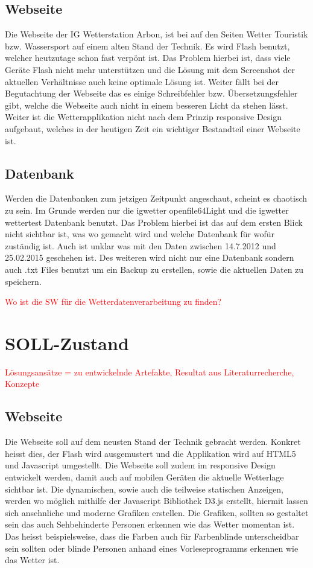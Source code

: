 \documentclass[a4paper,ngerman, 12pt]{report}
\newcommand\Diskussionspunkt[1]{\textcolor{red}{#1}}
\begin{document}
\subsection{Webseite}
Die Webseite der IG Wetterstation Arbon, ist bei auf den Seiten Wetter Touristik bzw. Wassersport auf einem alten Stand der Technik. Es wird Flash benutzt, welcher heutzutage schon fast verpönt ist. Das Problem hierbei ist, dass viele Geräte Flash nicht mehr unterstützen und die Lösung mit dem Screenshot der aktuellen Verhältnisse auch keine optimale Lösung ist. Weiter fällt bei der Begutachtung der Webseite das es einige Schreibfehler bzw. Übersetzungsfehler gibt, welche die Webseite auch nicht in einem besseren Licht da stehen lässt. Weiter ist die Wetterapplikation nicht nach dem Prinzip responsive Design aufgebaut, welches in der heutigen Zeit ein wichtiger Bestandteil einer Webseite ist. 
\subsection{Datenbank}
Werden die Datenbanken zum jetzigen Zeitpunkt angeschaut, scheint es chaotisch zu sein. Im Grunde werden nur die igwetter openfile64Light und die igwetter wettertest Datenbank benutzt. Das Problem hierbei ist das auf dem ersten Blick nicht sichtbar ist, was wo gemacht wird und welche Datenbank für wofür zuständig ist. Auch ist unklar was mit den Daten zwischen 14.7.2012 und 25.02.2015 geschehen ist. Des weiteren wird nicht nur eine Datenbank sondern auch .txt Files benutzt um ein Backup zu erstellen, sowie die aktuellen Daten zu speichern. 

\Diskussionspunkt{Wo ist die SW für die Wetterdatenverarbeitung zu finden?}

\section{SOLL-Zustand}
\Diskussionspunkt{Lösungsansätze = zu entwickelnde Artefakte, 
Resultat aus Literaturrecherche, 
Konzepte}

\subsection{Webseite}
Die Webseite soll auf dem neusten Stand der Technik gebracht werden. Konkret heisst dies, der Flash wird ausgemustert und die Applikation wird auf HTML5 und Javascript umgestellt. Die Webseite soll zudem im responsive Design entwickelt werden, damit auch auf mobilen Geräten die aktuelle Wetterlage sichtbar ist. Die dynamischen, sowie auch die teilweise statischen Anzeigen, werden wo möglich mithilfe der Javascript Bibliothek D3.js erstellt, hiermit lassen sich ansehnliche und moderne Grafiken erstellen. Die Grafiken, sollten so gestaltet sein das auch Sehbehinderte Personen erkennen wie das Wetter momentan ist. Das heisst beispielsweise, dass die Farben auch für Farbenblinde unterscheidbar sein sollten oder blinde Personen anhand eines Vorleseprogramms erkennen wie das Wetter ist. 
\end{document}

